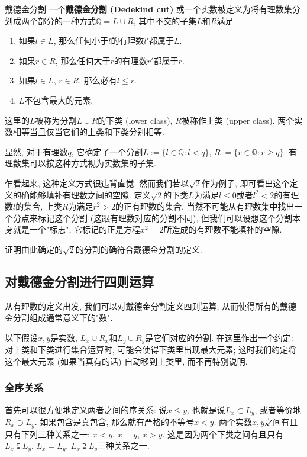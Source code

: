 \begin{definition}{戴德金分割}
一个\textbf{戴德金分割 (Dedekind cut)} 或一个实数被定义为将有理数集分划成两个部分的一种方式$\mathbb{Q}=L\cup R$, 其中不交的子集$L$和$R$满足

\begin{enumerate}
\item 如果$l\in L$, 那么任何小于$l$的有理数$l'$都属于$L$.
\item 如果$r\in R$, 那么任何大于$r$的有理数$r'$都属于$r$.
\item 如果$l\in L$, $r\in R$, 那么必有$l\leq r$.
\item $L$不包含最大的元素.
\end{enumerate}

这里的$L$被称为分割$L\cup R$的下类 (lower class), $R$被称作上类 (upper class). 两个实数相等当且仅当它们的上类和下类分别相等.
\end{definition}

显然, 对于有理数$q$, 它确定了一个分割$L:=\{l\in\mathbb{Q}:l<q\}$, $R:=\{r\in\mathbb{Q}:r\geq q\}$. 有理数集可以按这种方式视为实数集的子集.

乍看起来, 这种定义方式很违背直觉. 然而我们若以$\sqrt{2}$作为例子, 即可看出这个定义的确能够填补有理数之间的空隙. 定义$\sqrt{2}$的下类$L$为满足$l\leq0$或者$l^2<2$的有理数$l$的集合, 上类$R$为满足$r^2>2$的正有理数的集合. 当然不可能从有理数集中找出一个分点来标记这个分割 (这跟有理数对应的分割不同), 但我们可以设想这个分割本身就是一个"标志", 它标记的正是方程$x^2=2$所造成的有理数不能填补的空隙.
\begin{exercise}{}
证明由此确定的$\sqrt{2}$的分割的确符合戴德金分割的定义.
\end{exercise}

\subsection{对戴德金分割进行四则运算}
从有理数的定义出发, 我们可以对戴德金分割定义四则运算, 从而使得所有的戴德金分割组成通常意义下的"数". 

以下假设$x,y$是实数, $L_x\cup R_x$和$L_y\cup R_y$是它们对应的分割. 在这里作出一个约定: 对上类和下类进行集合运算时, 可能会使得下类里出现最大元素; 这时我们约定将这个最大元素 (如果当真有的话) 自动移到上类里, 而不再特别说明.

\subsubsection{全序关系}

首先可以很方便地定义两者之间的序关系: 说$x\leq y$, 也就是说$L_x\subset L_y$, 或者等价地$R_x\supset L_y$. 如果包含是真包含, 那么就有严格的不等号$x<y$. 两个实数$x,y$之间有且只有下列三种关系之一: $x<y$, $x=y$, $x>y$. 这是因为两个下类之间有且只有$L_x\subsetneqq L_y$, $L_x=L_y$, $L_x\supsetneqq L_y$三种关系之一.

